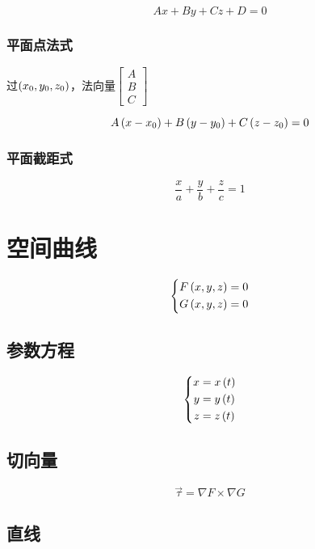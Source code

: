 \documentclass{article}
\begin{document}
\begin{definition}[]
    \[Ax+By+Cz+D=0\]
\end{definition}

\subsubsection{平面点法式}

过$\left(x_0,y_0,z_0\right)$，法向量$\begin{bmatrix}A\\B\\C\end{bmatrix}$

\[A\left(x-x_0\right)+
    B\left(y-y_0\right)+
    C\left(z-z_0\right)=0\]

\subsubsection{平面截距式}

\[\frac xa+\frac yb+\frac zc=1\]

\section{空间曲线}

\begin{definition}[]
    \[\left\{\begin{aligned}
            F\left(x,y,z\right) & =0 \\
            G\left(x,y,z\right) & =0
        \end{aligned}\right.\]
\end{definition}

\subsection{参数方程}

\[\left\{\begin{aligned}
        x & =x\left(t\right) \\
        y & =y\left(t\right) \\
        z & =z\left(t\right)
    \end{aligned}\right.\]

\subsection{切向量}

\[\vec\tau=\nabla F\times\nabla G\]

\subsection{直线}
\end{document}
